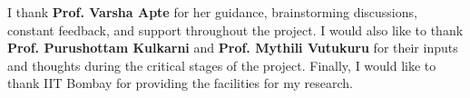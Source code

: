 \acknowledgments

I thank \textbf{Prof. Varsha Apte} for her guidance, brainstorming discussions, constant feedback, and support throughout the project. I would also like to thank \textbf{Prof. Purushottam Kulkarni} and \textbf{Prof. Mythili Vutukuru} for their inputs and thoughts during the critical stages of the project. Finally, I would like to thank IIT Bombay for providing the facilities for my research.



\signature[Indian Institute of Technology Bombay]{\today}


